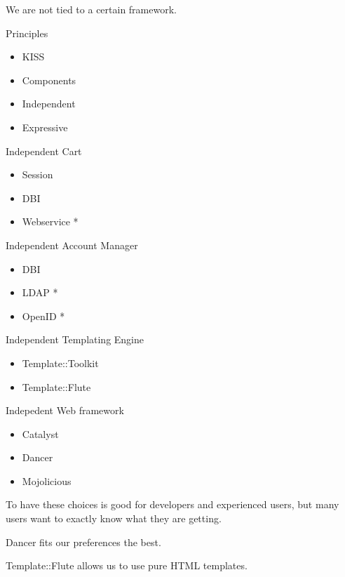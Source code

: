 We are not tied to a certain framework.

\begin{frame}{Principles}
\begin{itemize}
\item KISS
\item Components
\item Independent
\item Expressive
\end{itemize}
\end{frame}

\begin{frame}{Independent}
Cart
\begin{itemize}
\item Session
\item DBI
\item Webservice *
\end{itemize}
\end{frame}

\begin{frame}{Independent}
Account Manager
\begin{itemize}
\item DBI
\item LDAP *
\item OpenID *
\end{itemize}
\end{frame}

\begin{frame}{Independent}
Templating Engine
\begin{itemize}
\item Template::Toolkit
\item Template::Flute
\end{itemize}
\end{frame}

\begin{frame}{Indepedent}
Web framework
\begin{itemize}
\item Catalyst
\item Dancer
\item Mojolicious
\end{itemize}
\end{frame}

To have these choices is good for developers and experienced users, 
but many users want to exactly know what they are getting.

Dancer fits our preferences the best.

Template::Flute allows us to use pure HTML templates.

